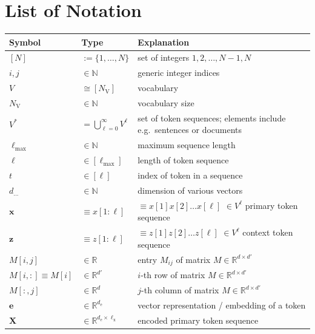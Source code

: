 \documentclass[12pt]{article}
\begin{document}
\section{List of Notation}
\begingroup
\setlength{\tabcolsep}{3pt} %
\small
\begin{longtable}{@{} p{} p{} p{} @{}}
\toprule
\textbf{Symbol} & \textbf{Type} & \textbf{Explanation} \\
\midrule
\endhead
$[N]$  & $:=\{1,\ldots,N\}$ & set of integers $1,2,\ldots,N-1,N$ \\
$i,j$  & $\in\mathbb{N}$ & generic integer indices \\
$V$    & $\cong[N_{\text{V}}]$ & vocabulary \\
$N_{\text{V}}$  & $\in\mathbb{N}$ & vocabulary size \\
$V^*$   & $=\bigcup_{\ell=0}^{\infty}V^\ell$ & set of token sequences; elements include e.g.\ sentences or documents \\
$\ell_{\text{max}}$ & $\in\mathbb{N}$ & maximum sequence length \\
$\ell$ & $\in[\ell_{\text{max}}]$ & length of token sequence \\
$t$ & $\in[\ell]$ & index of token in a sequence \\
$d_{\ldots}$ & $\in\mathbb{N}$ & dimension of various vectors \\
$\symbf{x}$ & $\equiv x[1\!:\!\ell]$ & $\equiv x[1]x[2]\ldots x[\ell]$ $\in V^\ell$  primary token sequence \\
$\symbf{z}$ & $\equiv z[1\!:\!\ell]$ & $\equiv z[1]z[2]\ldots z[\ell]$ $\in V^\ell$ context token sequence \\
$M[i,j]$ & $\in\mathbb{R}$ & entry $M_{ij}$ of matrix $M\in\mathbb{R}^{d\times d'}$ \\
$M[i,:]\equiv M[i]$ & $\in\mathbb{R}^{d'}$ & $i$-th row of matrix $M\in\mathbb{R}^{d\times d'}$ \\
$M[:,j]$ & $\in\mathbb{R}^{d}$ & $j$-th column of matrix $M\in\mathbb{R}^{d\times d'}$ \\
$\symbf{e}$ & $\in\mathbb{R}^{d_{\text{e}}}$ & vector representation / embedding of a token \\
$\symbf{X}$ & $\in\mathbb{R}^{d_{\text{e}}\times\ell_{\text{x}}}$ & encoded primary token sequence \\

\end{longtable}
\end{document}
